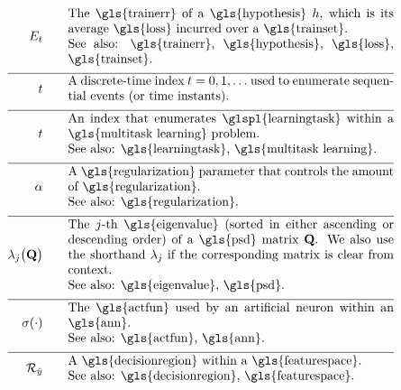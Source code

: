 \begin{align}                          
	\trainerror \quad\quad &\parbox{.75\textwidth}{The \gls{trainerr} of a \gls{hypothesis} $\hypothesis$, which is its 
		average \gls{loss} incurred over a \gls{trainset}.
		\\ See also: \gls{trainerr}, \gls{hypothesis}, \gls{loss}, \gls{trainset}. }\nonumber \\[2mm] \hline \nonumber\\[-5mm]
	\timeidx \quad\quad &\parbox{.75\textwidth}{A discrete-time index $\timeidx=0,1,\ldots$ used to 
		enumerate sequential events (or time instants). }\nonumber \\[2mm] \hline \nonumber\\[-5mm]
	\taskidx \quad\quad &\parbox{.75\textwidth}{An index that enumerates
		\glspl{learningtask} within a \gls{multitask learning} problem.
		\\ See also: \gls{learningtask}, \gls{multitask learning}. }\nonumber \\[2mm] \hline \nonumber\\[-5mm]
	\regparam \quad\quad &\parbox{.75\textwidth}{A \gls{regularization} parameter that controls 
		the amount of \gls{regularization}.
		\\ See also: \gls{regularization}. } \nonumber \\[2mm] \hline \nonumber\\[-5mm]
	\eigval{\featureidx}\big( \mathbf{Q} \big) \quad\quad &\parbox{.75\textwidth}{The $\featureidx$-th 
		\gls{eigenvalue} (sorted in either ascending or descending order) of a \gls{psd} matrix $\mathbf{Q}$. We also 
		use the shorthand $\eigval{\featureidx}$ if the corresponding matrix is clear from context.
		\\ See also: \gls{eigenvalue}, \gls{psd}. }\nonumber \\[2mm] \hline \nonumber\\[-5mm]
	\actfun(\cdot) \quad\quad &\parbox{.75\textwidth}{The \gls{actfun} used by an artificial neuron within an \gls{ann}.
		\\ See also: \gls{actfun}, \gls{ann}. }\nonumber \\[2mm] \hline \nonumber\\[-5mm]
	\decreg{\hat{\truelabel}} \quad\quad &\parbox{.75\textwidth}{A \gls{decisionregion} within a \gls{featurespace}.
		\\ See also: \gls{decisionregion}, \gls{featurespace}. }\nonumber
\end{align}     

